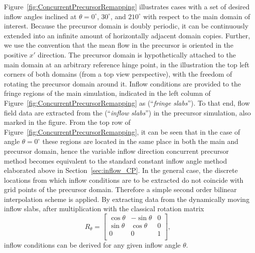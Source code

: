 	Figure~\ref{fig:ConcurrentPrecursorRemapping} illustrates cases with a set of desired inflow angles inclined at $\theta = 0^\circ$, $30 ^{\circ}$, and $210^\circ$ with respect to the main domain of interest.
	Because the precursor domain is doubly periodic, it can be continuously extended into an infinite amount of horizontally adjacent domain copies. Further, we use the convention that the mean flow in the precursor is oriented in the positive $x'$ direction. The precursor domain is hypothetically attached to the main domain at an arbitrary reference hinge point, in the illustration the top left corners of both domains (from a top view perspective), with the freedom of rotating the precursor domain around it. Inflow conditions are provided to the fringe regions of the main simulation, indicated in the left column of Figure~\ref{fig:ConcurrentPrecursorRemapping} as (``\emph{fringe slabs}''). To that end, flow field data are extracted from the (``\emph{inflow slabs}'') in the precursor simulation, also marked in the figure. From the top row of Figure~\ref{fig:ConcurrentPrecursorRemapping}, it can be seen that in the case of angle $\theta = 0 ^{\circ}$ these regions are located in the same place in both the main and precursor domain, hence the variable inflow direction concurrent precursor method becomes equivalent to the standard constant inflow angle method elaborated above in Section~\ref{sec:inflow_CP}. In the general case, the discrete locations from which inflow conditions are to be extracted do not coincide with grid points of the precursor domain. Therefore a simple second order bilinear interpolation scheme is applied. By extracting data from the dynamically moving inflow slabs, after multiplication with the classical rotation matrix
	\begin{equation}\label{eq:rotationmatrix}
	R_{\theta} = \begin{bmatrix}
	\cos \theta & - \sin \theta & 0 \\
	\sin \theta & \cos \theta   & 0 \\
	0             &  0                & 1 \\
	\end{bmatrix},
	\end{equation}
	inflow conditions can be derived for any given inflow angle $\theta$.
	
